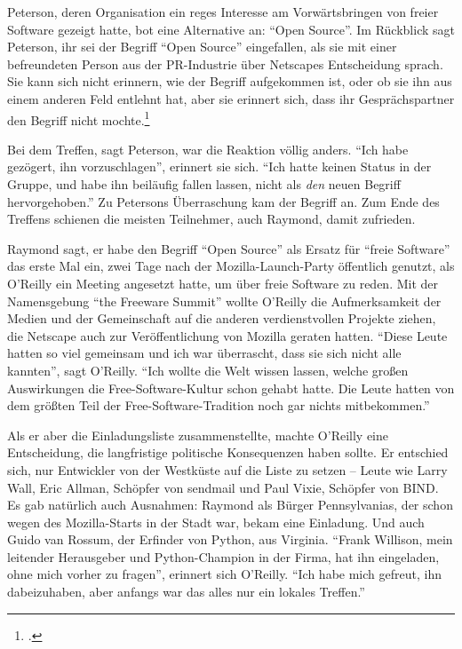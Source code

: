 Peterson, deren Organisation ein reges Interesse am Vorwärtsbringen von freier Software gezeigt hatte, bot eine Alternative an: "`Open Source"'. Im Rückblick sagt Peterson, ihr sei der Begriff "`Open Source"' eingefallen, als sie mit einer befreundeten Person aus der PR-Industrie über Netscapes Entscheidung sprach. Sie kann sich nicht erinnern, wie der Begriff aufgekommen ist, oder ob sie ihn aus einem anderen Feld entlehnt hat, aber sie erinnert sich, dass ihr Gesprächspartner den Begriff nicht mochte.\footcite{profitmot}

Bei dem Treffen, sagt Peterson, war die Reaktion völlig anders. "`Ich habe gezögert, ihn vorzuschlagen"', erinnert sie sich. "`Ich hatte keinen Status in der Gruppe, und habe ihn beiläufig fallen lassen, nicht als \textit{den} neuen Begriff hervorgehoben."' Zu Petersons Überraschung kam der Begriff an. Zum Ende des Treffens schienen die meisten Teilnehmer, auch Raymond, damit zufrieden.

Raymond sagt, er habe den Begriff "`Open Source"' als Ersatz für "`freie Software"' das erste Mal ein, zwei Tage nach der Mozilla-Launch-Party öffentlich genutzt, als  O'Reilly ein Meeting angesetzt hatte, um über freie Software zu reden. Mit der Namensgebung "`the Freeware Summit"' wollte O'Reilly die Aufmerksamkeit der Medien und der Gemeinschaft auf die anderen verdienstvollen Projekte ziehen, die Netscape auch zur Veröffentlichung von Mozilla geraten hatten.
"`Diese Leute hatten so viel gemeinsam und ich war überrascht, dass sie sich nicht alle kannten"', sagt O'Reilly. "`Ich wollte die Welt wissen lassen, welche großen Auswirkungen die Free-Software-Kultur schon gehabt hatte. Die Leute hatten von dem größten Teil der Free-Software-Tradition noch gar nichts mitbekommen."'

Als er aber die Einladungsliste zusammenstellte, machte O'Reilly eine Entscheidung, die langfristige politische Konsequenzen haben sollte. Er entschied sich, nur Entwickler von der Westküste auf die Liste zu setzen – Leute wie Larry Wall, Eric Allman, Schöpfer von sendmail und Paul Vixie, Schöpfer von BIND. Es gab natürlich auch Ausnahmen: Raymond als Bürger Pennsylvanias, der schon wegen des Mozilla-Starts in der Stadt war, bekam eine Einladung. Und auch Guido van Rossum, der Erfinder von Python, aus Virginia. "`Frank Willison, mein leitender Herausgeber und Python-Champion in der Firma, hat ihn eingeladen, ohne mich vorher zu fragen"', erinnert sich O’Reilly. "`Ich habe mich gefreut, ihn dabeizuhaben, aber anfangs war das alles nur ein lokales Treffen."'

